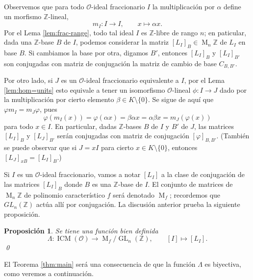 \documentclass[11pt,a4paper]{amsart}
\newcommand{\Z}{\mathbb{Z}}
\DeclareMathOperator{\ICM}{ICM}
\DeclareMathOperator{\M}{M}
\DeclareMathOperator{\GL}{GL}
\theoremstyle{plain}
\newtheorem{prop}[equation]{Proposición}
\renewcommand{\O}{\mathcal{O}}
\begin{document}
Observemos que para todo $\O$-ideal fraccionario $I$
la multiplicación por $\alpha$ define un morfismo
$\Z$-lineal,
\[
m_I \colon I \to I, \qquad x \mapsto \alpha x.
\]
Por el Lema \ref{lem:frac-range}, todo tal ideal $I$ es $\Z$-libre
de rango $n$; en paticular, dada una $\Z$-base $B$ de $I$, podemos considerar
la matriz $[L_I]_B \in \M_n \Z$ de $L_I$ en base $B$.
Si cambiamos la base por otra, digamos $B'$, entonces $[L_I]_B$
y $[L_I]_{B'}$ son conjugadas con matriz de conjugación
la matriz de cambio de base $C_{B,B'}$.

Por otro lado, si $J$ es un $\O$-ideal fraccionario equivalente a $I$,
por el Lema \ref{lem:hom=units} esto equivale a tener un
isomorfismo $\O$-lineal $\phi \colon I \to J$
dado por la multiplicación
por cierto elemento $\beta \in K \setminus \{0\}$. Se sigue de aquí que
$\varphi m_I = m_J \varphi$, pues
\[
\varphi(m_I(x)) = \varphi(\alpha x) = \beta \alpha x
= \alpha \beta x = m_J(\varphi(x))
\]
para todo $x \in I$. En particular, dadas $\Z$-bases $B$ de $I$ y $B'$ de $J$,
las matrices $[L_I]_{B}$ y $[L_J]_{B'}$ serán conjugadas con matriz de
conjugación $[\varphi]_{B, B'}$. (También se puede observar que si $J = xI$
para cierto $x \in K \setminus \{0\}$, entonces $[L_J]_{xB} = [L_I]_B$.)

Si $I$ es un $\O$-ideal fraccionario,
vamos a notar $[L_I]$ a la clase de conjugación de las matrices $[L_I]_B$
donde $B$ es una $\Z$-base de $I$. El conjunto de matrices de $\M_n \Z$
de polinomio característico $f$ será denotado $\M_f$; recordemos que
$GL_n(\Z)$ actúa allí por conjugación.
La discusión anterior prueba la siguiente proposición.

\begin{prop} Se tiene una función bien definida
\begin{equation}\label{def:lambda}
\Lambda \colon \ICM(\O) \to \M_f/\GL_n(\Z), \qquad [I] \mapsto [L_I].
\end{equation}
\qed
\end{prop}

El Teorema \ref{thm:main} será una consecuencia de que la función $\Lambda$
es biyectiva, como veremos a continuación.
\end{document}
